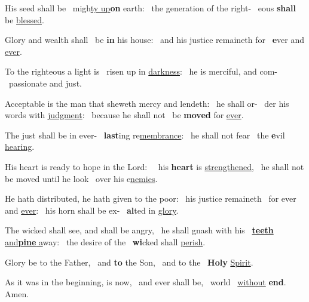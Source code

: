 \documentclass[12pt]{article} %
\def\noinitial{%
\gresetfirstlineaboveinitial{\textcolor{benred8}{\small \textsc{\textbf{}}}}{\textcolor{benred8}{\small \textsc{\textbf{}}}}
\setspaceafterinitial{0pt plus 0em minus 0em}%
\setspacebeforeinitial{0pt plus 0em minus 0em}%
\relax %
}
\newenvironment{psalmtext}{\leftskip 0.25in}{\vspace{2 mm}}
\def\pipe{\textcolor{benred8}{\textdoublepipe}}
\let\oldgresixstar\gresixstar
\renewcommand{\gresixstar}{\textcolor{benred8}{\oldgresixstar}}
\let\oldgredagger\gredagger
\renewcommand{\gredagger}{\textcolor{benred8}{\oldgredagger}}
\begin{document}
\begin{pages}
\begin{Rightside}
\pend\pstart

{\noinitial
{}
}

\pend\pstart

\begin{psalmtext}

His seed shall be \pipe\ migh\uline{ty up}\textbf{on} earth: \gresixstar\ the generation of the right- \pipe\ eous \textbf{shall} be \uline{blessed}.

Glory and wealth shall \pipe\ be \textbf{in} his house: \gresixstar\ and his justice remaineth for \pipe\ \textbf{e}ver and \uline{ever}.

To the righteous a light is \pipe\ risen up in \uline{darkness}: \gresixstar\ he is merciful, and com- \pipe\ passionate and just.

Acceptable is the man that sheweth mercy and lendeth: \gredagger\ he shall or- \pipe\ der his words with \uline{judgment}: \gresixstar\ because he shall not \pipe\ be \textbf{moved} for \uline{ever}.

The just shall be in ever- \pipe\ \textbf{last}ing re\underline{membrance}: \gresixstar\ he shall not fear \pipe\ the \textbf{e}vil \uline{hearing}.

His heart is ready to hope in the Lord: \gredagger\ \pipe\ his \textbf{heart} is \uline{strengthened}, \gresixstar\ he shall not be moved until he look \pipe\ over his e\uline{nemies}.

He hath distributed, he hath given to the poor: \gredagger\ his justice remaineth \pipe\ for ever and \uline{ever}: \gresixstar\ his horn shall be ex- \pipe\ \textbf{al}ted in \uline{glory}.

The wicked shall see, and shall be angry, \gredagger\ he shall gnash with his \pipe\ \uline{\textbf{teeth} and}\hspace{2mm}\uline{\textbf{pine} a}way: \gresixstar\ the desire of the \pipe\ \textbf{wi}cked shall \uline{perish}.

Glory be to the Father, \pipe\ and \textbf{to} the Son, \gresixstar\ and to the \pipe\ \textbf{Holy} \uline{Spirit}.

As it was in the beginning, is now, \pipe\ and ever shall be, \gresixstar\ world \pipe\ \uline{without} \textbf{end}. Amen.

\end{psalmtext}


\end{Rightside}
\end{pages}
\end{document}
